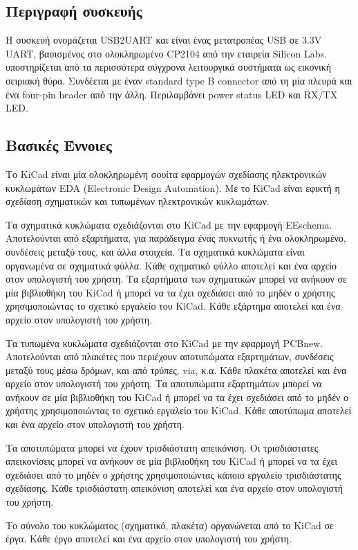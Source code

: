 \documentclass[a4paper]{article}
\begin{document}
\subsection{Περιγραφή συσκευής}
Η συσκευή ονομάζεται USB2UART και είναι ένας μετατροπέας USB σε 3.3V UART, βασισμένος στο ολοκληρωμένο CP2104 από την εταιρεία Silicon Labs. υποστηρίζεται από τα περισσότερα σύγχρονα λειτουργικά συστήματα ως εικονική σειριακή θύρα. Συνδέεται με έναν standard type B connector από τη μία πλευρά και ένα four-pin header από την άλλη. Περιλαμβάνει power status LED και RX/TX LED.

\subsection{Βασικές Έννοιες}
Το KiCad είναι μία ολοκληρωμένη σουίτα εφαρμογών σχεδίασης ηλεκτρονικών κυκλωμάτων EDA (Electronic Design Automation). Με το KiCad είναι εφικτή η σχεδίαση σχηματικών και τυπωμένων ηλεκτρονικών κυκλωμάτων.

Τα σχηματικά κυκλώματα  σχεδιάζονται στο KiCad με την εφαρμογή EEschema. Αποτελούνται από εξαρτήματα, για παράδειγμα ένας πυκνωτής ή ένα ολοκληρωμένο, συνδέσεις μεταξύ τους, και άλλα στοιχεία. Τα σχηματικά κυκλώματα είναι οργανωμένα σε σχηματικά φύλλα. Κάθε σχηματικό φύλλο αποτελεί και ένα αρχείο στον υπολογιστή του χρήστη.
Τα εξαρτήματα των σχηματικών μπορεί να ανήκουν σε μία βιβλιοθήκη του KiCad ή μπορεί να τα έχει σχεδιάσει από το μηδέν ο χρήστης χρησιμοποιώντας το σχετικό εργαλείο του KiCad. Κάθε εξάρτημα αποτελεί και ένα αρχείο στον υπολογιστή του χρήστη.

Τα τυπωμένα κυκλώματα σχεδιάζονται στο KiCad με την εφαρμογή PCBnew. Αποτελούνται από πλακέτες που περιέχουν αποτυπώματα εξαρτημάτων, συνδέσεις μεταξύ τους μέσω δρόμων, και από τρύπες, via, κ.α.
Κάθε πλακέτα αποτελεί και ένα αρχείο στον υπολογιστή του χρήστη. 
Τα αποτυπώματα εξαρτημάτων μπορεί να ανήκουν σε μία βιβλιοθήκη του KiCad ή μπορεί να τα έχει σχεδιάσει από το μηδέν ο χρήστης χρησιμοποιώντας το σχετικό εργαλείο του KiCad. Κάθε αποτύπωμα αποτελεί και ένα αρχείο στον υπολογιστή του χρήστη. 

Τα αποτυπώματα μπορεί να έχουν τρισδιάστατη απεικόνιση. Οι τρισδιάστατες απεικονίσεις μπορεί να ανήκουν σε μία βιβλιοθήκη του KiCad ή μπορεί να τα έχει σχεδιάσει από το μηδέν ο χρήστης χρησιμοποιώντας κάποιο εργαλείο τρισδιάστατης σχεδίασης. Κάθε τρισδιάστατη απεικόνιση αποτελεί και ένα αρχείο στον υπολογιστή του χρήστη. 

Το σύνολο του κυκλώματος (σχηματικό, πλακέτα) οργανώνεται από το KiCad σε έργα. Κάθε έργο αποτελεί και ένα αρχείο στον υπολογιστή του χρήστη. 
\end{document}
